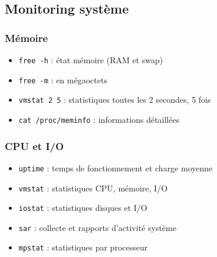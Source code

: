 \documentclass[12pt,a4paper]{article}
\begin{document}

\subsection{Monitoring syst\`eme}

\subsubsection{M\'emoire}
\begin{itemize}
    \item \texttt{free -h} : \'etat m\'emoire (RAM et swap) %
    \item \texttt{free -m} : en m\'egaoctets %
    \item \texttt{vmstat 2 5} : statistiques toutes les 2 secondes, 5 fois %
    \item \texttt{cat /proc/meminfo} : informations d\'etaill\'ees %
\end{itemize}

\subsubsection{CPU et I/O}
\begin{itemize}
    \item \texttt{uptime} : temps de fonctionnement et charge moyenne %
    \item \texttt{vmstat} : statistiques CPU, m\'emoire, I/O %
    \item \texttt{iostat} : statistiques disques et I/O %
    \item \texttt{sar} : collecte et rapports d'activit\'e syst\`eme %
    \item \texttt{mpstat} : statistiques par processeur %
\end{itemize}
\end{document}

